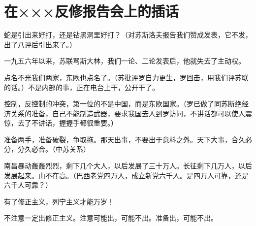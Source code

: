 \section[在×××反修报告会上的插话（一九六四年九月四日）]{在×××反修报告会上的插话}


蛇是引出来好打，还是钻黑洞里好打？（对苏斯洛夫报告我们赞成发表，它不发，出了八评后引出来了。）

一九五六年以来，苏联骂斯大林，我们一论、二论发表后，他就失去了主动权。

点名不光我们两家，东欧也点名了。（苏批评罗自力更生，罗回击，用我们评苏联的话。）不是内部的事，正在电台上干，公开干了。

控制，反控制的冲突，第一位的不是中国，而是东欧国家。（罗已做了同苏断绝经济关系的准备，自己不能制造武器，要求我国去人到罗访问，不讲话都可以使人震惊，去了不讲话，握握手都很重要。）

准备两手，准备破裂，争取拖。那天出事，不要出于意料之外。天下大事，合久必分，分久必合。（中苏关系）

南昌暴动轰轰烈烈，剩下几个大人，以后发展了三十万人。长征剩下几万人，以后发展起来。山不在高。（巴西老党四万人，成立新党六千人。是四万人可靠，还是六千人可靠？）

有了修正主义，列宁主义才能万岁！

不注意一定出修正主义。注意可能出，可能不出。准备出，可能不出。

